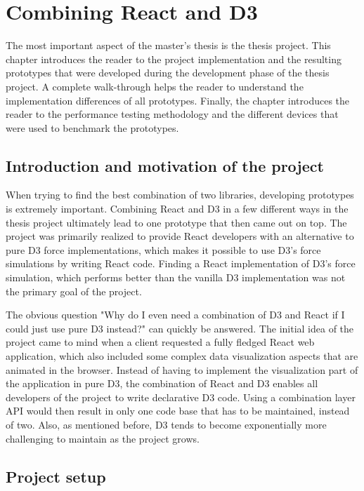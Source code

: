 \chapter{Combining React and D3}
\label{cha:visualization}

The most important aspect of the master's thesis is the thesis project. This chapter introduces the reader to the project implementation and the resulting prototypes that were developed during the development phase of the thesis project. A complete walk-through helps the reader to understand the implementation differences of all prototypes. Finally, the chapter introduces the reader to the performance testing methodology and the different devices that were used to benchmark the prototypes.

\section{Introduction and motivation of the project}

When trying to find the best combination of two libraries, developing prototypes is extremely important. Combining React and D3 in a few different ways in the thesis project ultimately lead to one prototype that then came out on top. The project was primarily realized to provide React developers with an alternative to pure D3 force implementations, which makes it possible to use D3's force simulations by writing React code. Finding a React implementation of D3's force simulation, which performs better than the vanilla D3 implementation was not the primary goal of the project.

The obvious question "Why do I even need a combination of D3 and React if I could just use pure D3 instead?" can quickly be answered. The initial idea of the project came to mind when a client requested a fully fledged React web application, which also included some complex data visualization aspects that are animated in the browser. Instead of having to implement the visualization part of the application in pure D3, the combination of React and D3 enables all developers of the project to write declarative D3 code. Using a combination layer API would then result in only one code base that has to be maintained, instead of two. Also, as mentioned before, D3 tends to become exponentially more challenging to maintain as the project grows.

\section{Project setup}
\label{sub:projectSetup}


